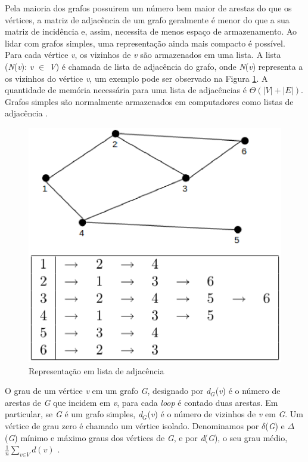 Pela maioria dos grafos possuirem um número bem maior de arestas do que os vértices, a matriz de adjacência de um grafo geralmente é menor do que a sua matriz de incidência e, assim, necessita de menos espaço de armazenamento. Ao lidar com grafos simples, uma representação ainda mais compacto é possível. Para cada vértice \textit{v}, os vizinhos de \textit{v} são armazenados em uma lista. A lista (\textit{N}(\textit{v}): \textit{v $\in$ V}) é chamada de lista de adjacência do grafo, onde \textit{N}(\textit{v}) representa a os vizinhos do vértice \textit{v}, um exemplo pode ser observado na Figura \ref{lista_adjacencia}. A quantidade de memória necessária para uma lista de adjacências é $\Theta(|\textit{V}| + |\textit{E}|)$. Grafos simples são normalmente armazenados em computadores como listas de adjacência \cite{Costa:2011}.

\begin{figure}[!h]
	\centering
	\includegraphics[scale=0.5]{figuras/capitulo1/lista_adjacencia.eps}
	\caption{Representação em lista de adjacência}
	\label{lista_adjacencia}
\end{figure}

O grau de um vértice \textit{v} em um grafo \textit{G}, designado por \textit{d$_G$}(\textit{v}) é o número de arestas de \textit{G} que incidem em \textit{v}, para cada \textit{loop} é contado duas arestas. Em particular, se \textit{G} é um grafo simples, \textit{d$_G$}(\textit{v}) é o número de vizinhos de \textit{v} em \textit{G}. Um vértice de grau zero é chamado um vértice isolado. Denominamos por $\delta$(\textit{G}) e $\Delta$(\textit{G}) mínimo e máximo graus dos vértices de \textit{G}, e por \textit{d}(\textit{G}), o seu grau médio, $\frac{1}{n}\sum_{\textit{v}\in\textit{V}} \textit{d}(\textit{v})$ \cite{Diestel:1997}.

